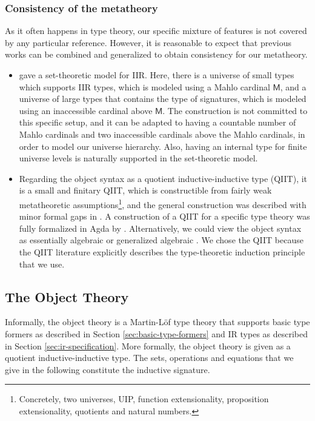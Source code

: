 \documentclass[acmsmall,screen,review]{acmart}
\newcommand{\msf}[1]{{\mathsf{#1}}}
\begin{document}
\subsubsection{Consistency of the metatheory} As it often happens in type theory, our specific mixture
of features is not covered by any particular reference. However, it is reasonable to expect that
previous works can be combined and generalized to obtain consistency for our metatheory.
\begin{itemize}
\item \citet{DBLP:journals/jlp/DybjerS06} gave a set-theoretic model for IIR. Here, there is a
  universe of small types which supports IIR types, which is modeled using a Mahlo cardinal
  $\msf{M}$, and a universe of large types that contains the type of signatures, which is modeled
  using an inaccessible cardinal above $\msf{M}$. The construction is not committed to this specific
  setup, and it can be adapted to having a countable number of Mahlo cardinals and two inaccessible
  cardinals above the Mahlo cardinals, in order to model our universe hierarchy. Also, having an
  internal type for finite universe levels is naturally supported in the set-theoretic model.
\item Regarding the object syntax as a quotient inductive-inductive type (QIIT), it is a small and
  finitary QIIT, which is constructible from fairly weak metatheoretic
  assumptions\footnote{Concretely, two universes, UIP, function extensionality, proposition
  extensionality, quotients and natural numbers.}, and the general construction was described with
  minor formal gaps in \cite{DBLP:journals/corr/abs-2302-08837}. A construction of a QIIT for a
  specific type theory was fully formalized in Agda by \citet{initiality-agda}. Alternatively, we
  could view the object syntax as essentially algebraic \cite{partialhorn} or generalized algebraic
  \cite{cartmellthesis}. We chose the QIIT because the QIIT literature explicitly describes the
  type-theoretic induction principle that we use.
\end{itemize}

\subsection{The Object Theory}\label{sec:object-theory}

Informally, the object theory is a Martin-Löf type theory that supports basic type formers as
described in Section \ref{sec:basic-type-formers} and IR types as described in Section
\ref{sec:ir-specification}. More formally, the object theory is given as a quotient
inductive-inductive type. The sets, operations and equations that we give in the following
constitute the inductive signature.
\end{document}
